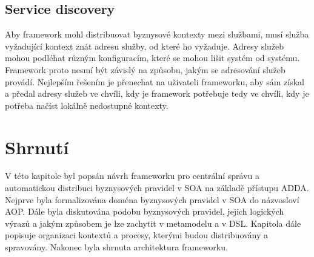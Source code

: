 \subsection{Service discovery}

Aby framework mohl distribuovat byznysové kontexty mezi službami, musí služba vyžadující kontext
znát adresu služby, od které ho vyžaduje. Adresy služeb mohou podléhat různým konfiguracím,
které se mohou lišit systém od systému. Framework proto nesmí být závislý na způsobu,
jakým se adresování služeb provádí. Nejlepším řešením je přenechat na uživateli frameworku, aby sám
získal a předal adresy služeb ve chvíli, kdy je framework potřebuje \textendash\xspace tedy
ve chvíli, kdy je potřeba načíst lokálně nedostupné kontexty.

\section{Shrnutí}

V této kapitole byl popsán návrh frameworku pro centrální správu a automatickou distribuci
byznysových pravidel v \gls{SOA} na základě přístupu \gls{ADDA}. Nejprve byla formalizována
doména byznysových pravidel v \gls{SOA} do názvosloví \gls{AOP}. Dále byla diskutována podobu byznysových pravidel,
jejich logických výrazů a jakým způsobem je lze zachytit v metamodelu a v \gls{DSL}.
Kapitola dále popisuje organizaci kontextů a procesy, kterými budou distribuovány a spravovány.
Nakonec byla shrnuta architektura frameworku.
